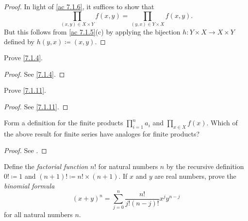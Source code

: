 \begin{proof}
  In light of \cref{ac 7.1.6}, it suffices to show that
  \[
    \prod_{(x, y) \in X \times Y} f(x, y) = \prod_{(y, x) \in Y \times X} f(x, y).
  \]
  But this follows from \cref{ac 7.1.5}(c) by applying the bijection \(h : Y \times X \to X \times Y\) defined by \(h(y, x) \coloneqq (x, y)\).
\end{proof}

\exercisesection

\begin{exercise}\label{ex 7.1.1}
  Prove \cref{7.1.4}.
\end{exercise}

\begin{proof}
  See \cref{7.1.4}.
\end{proof}

\begin{exercise}\label{ex 7.1.2}
  Prove \cref{7.1.11}.
\end{exercise}

\begin{proof}
  See \cref{7.1.11}.
\end{proof}

\begin{exercise}\label{ex 7.1.3}
  Form a definition for the finite products \(\prod_{i = 1}^n a_i\) and \(\prod_{x \in X} f(x)\).
  Which of the above result for finite series have analoges for finite products?
\end{exercise}

\begin{proof}
  See .
\end{proof}

\begin{exercise}\label{ex 7.1.4}
  Define the \emph{factorial function} \(n!\) for natural numbers \(n\) by the recursive definition \(0! \coloneqq 1\) and \((n + 1)! \coloneqq n! \times (n + 1)\).
  If \(x\) and \(y\) are real numbers, prove the \emph{binomial formula}
  \[
    (x + y)^n = \sum_{j = 0}^n \frac{n!}{j!(n - j)!} x^j y^{n - j}
  \]
  for all natural numbers \(n\).
\end{exercise}

